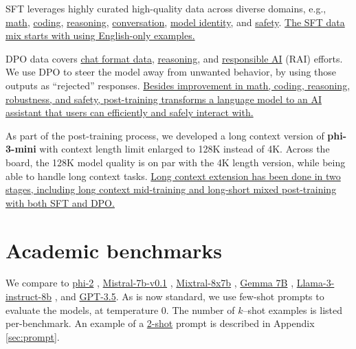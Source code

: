 \documentclass[11pt]{article}
\begin{document}
SFT leverages highly curated  high-quality data across diverse domains, e.g., \uline{math}, \uline{coding}, \uline{reasoning}, \uline{conversation}, \uline{model identity}, and \uline{safety}. \uline{The SFT data mix starts with using English-only examples.}

DPO data covers \uline{chat format data}, \uline{reasoning}, and \uline{responsible AI} (RAI) efforts. We use DPO to steer the model away from unwanted behavior, by using those outputs as “rejected” responses. \uline{Besides improvement in math, coding, reasoning, robustness, and safety, post-training transforms a language model to an AI assistant that users can efficiently and safely interact with.}

As part of the post-training process, we  developed a long context version of \textbf{phi-3-mini} with context length limit enlarged to 128K instead of 4K. Across the  board, the 128K model quality is on par with the 4K length version, while being able to handle long context tasks. \uline{Long context extension has been done in two stages, including long context mid-training and long-short mixed post-training with both SFT and DPO.}

\section{Academic benchmarks}

We compare to \uline{phi-2} \cite{javaheripi2023phi}, \uline{Mistral-7b-v0.1} \cite{jiang2023mistral}, \uline{Mixtral-8x7b} \cite{jiang2024mixtral}, \uline{Gemma 7B} \cite{gemmateam2024gemma}, \uline{Llama-3-instruct-8b} \cite{llama3}, and \uline{GPT-3.5}. As is now standard, we use few-shot prompts to evaluate the models, at temperature $0$. The number of $k$--shot examples is listed per-benchmark. An example of a \uline{2-shot} prompt is described in Appendix \ref{sec:prompt}.
\end{document}
